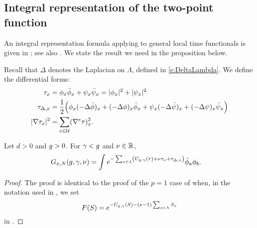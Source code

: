 
\subsection{Integral representation of the two-point function}
\label{sec:Gintrep}

An integral representation formula applying to general local time functionals
is given in \cite{BEI92,BIS09}; see also \cite[Appendix~A]{ST-phi4}.
We state the result we need in the proposition below.

Recall that $\Delta$ denotes the Laplacian on $\Lambda$, defined in \eqref{e:DeltaLambda}.
We define the differential forms:
\begin{align}
\tau_x
&= \phi_x \bar\phi_x
+ \psi_x   \bar\psi_x
= |\phi_x|^2 + |\psi_x|^2 \\
\label{e:addDelta}
\tau_{\Delta,x}
&=
\frac 12 \Big(
\phi_{x} (- \Delta \bar{\phi})_{x} + (- \Delta \phi)_{x} \bar{\phi}_{x} +
\psi_{x}  (- \Delta \bar{\psi})_{x} + (- \Delta \psi)_{x}  \bar{\psi}_{x}
\Big) \\
|\nabla \tau_x|^2
&= \sum_{e\in\mathcal{U}} (\nabla^e \tau)_x^2.
\end{align}

\begin{prop}
Let $d > 0$ and $g > 0$. For $\gamma < g$ and $\nu \in {\mathbb R}$,
\begin{align}
G_{x,N}(g, \gamma, \nu)
&=  \int
    e^{-\sum_{x\in\Lambda}
    \left(
    U_{g,\gamma}(\tau)
    + \nu \tau_x + \tau_{\Delta,x}\right)} \bar\phi_a \phi_b
    .
    \label{e:Grep-pos-bis}
\end{align}
\end{prop}

\begin{proof}
The proof is identical to the proof of the $p = 1$ case of
\cite[Proposition~\ref{phi4-prop:Integral-Representation}]{ST-phi4}
when, in the notation used in \cite{ST-phi4}, we set
\begin{equation}
F(S) = e^{-U_{g,\gamma}(S) - (\nu - 1) \sum_{x\in\Lambda} S_x}
\end{equation}
in \cite[\eqref{phi4-e:intrep1}]{ST-phi4}.
\end{proof}

